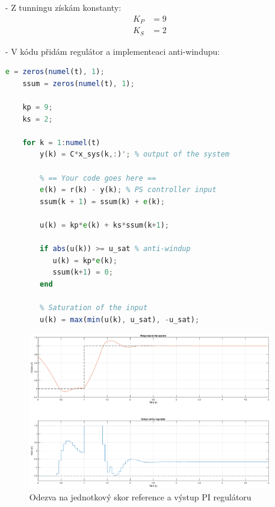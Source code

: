 \documentclass{article}
\begin{document}
\begin{itemize}
    \item[-] Z tunningu získám konstanty:
    \begin{align*}
        K_P &= 9\\
        K_S &= 2
    \end{align*}

    \item[-] V kódu přidám regulátor a implementeaci anti-windupu:

    \begin{lstlisting}[language=Octave, caption=Část implementace]
    e = zeros(numel(t), 1);
    ssum = zeros(numel(t), 1);
    
    kp = 9;
    ks = 2;
    
    for k = 1:numel(t)
        y(k) = C*x_sys(k,:)'; % output of the system
    
        % == Your code goes here ==
        e(k) = r(k) - y(k); % PS controller input
        ssum(k + 1) = ssum(k) + e(k); 
        
        u(k) = kp*e(k) + ks*ssum(k+1); 
       
        if abs(u(k)) >= u_sat % anti-windup 
           u(k) = kp*e(k);
           ssum(k+1) = 0;
        end
       
        % Saturation of the input
        u(k) = max(min(u(k), u_sat), -u_sat);\end{lstlisting}
    


    

    \begin{figure}[H]
        \centering
        \includegraphics[clip, width=1.00\textwidth]{Response.eps}
        \caption{Odezva na jednotkový skor reference a výstup PI regulátoru}
        \label{fig:Model_1}
    \end{figure}
\end{itemize}
\end{document}
